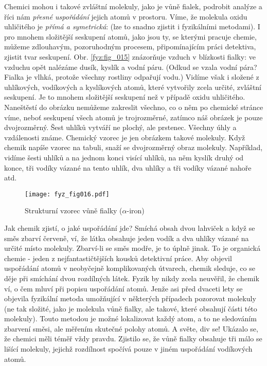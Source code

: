{      Chemici mohou i takové zvláštní molekuly, jako je vůně fialek, podrobit analýze a říci nám 
      \emph{přesné uspořádání} jejich atomů v prostoru. Víme, že molekula oxidu uhličitého je 
      \emph{přímá a symetrická}:  (lze to snadno zjistit i fyzikálními 
      metodami). I pro mnohem složitější seskupení atomů, jako jsou ty, se kterými pracuje chemie, 
      můžeme zdlouhavým, pozoruhodným procesem, připomínajícím práci detektiva, zjistit tvar 
      seskupení. Obr. \ref{fyz:fig_015} znázorňuje vzduch v blízkosti fialky: ve vzduchu opět 
      nalézáme dusík, kyslík a vodní páru. (Odkud se vzala vodní pára? Fialka je vlhká, protože 
      všechny rostliny odpařují vodu.) Vidíme však i  složené z uhlíkových, vodíkových 
      a kyslíkových atomů, které vytvořily zcela určité, zvláštní seskupení. Je to mnohem 
      složitější seskupení než v případě oxidu uhličitého. Naneštěstí do obrázku nemůžeme zakreslit 
      všechno, co o něm po chemické stránce víme, neboť seskupení všech atomů je trojrozměrné, 
      zatímco náš obrázek je pouze dvojrozměrný. Šest uhlíků vytváří ne plochý, ale  
      prstenec. Všechny úhly a vzdálenosti známe. Chemický vzorec je jen obrázkem takové molekuly. 
      Když chemik napíše vzorec na tabuli, snaží se  dvojrozměrný obraz molekuly. 
      Například, vidíme  šesti uhlíků a na jednom konci visící  uhlíků, na 
      něm kyslík druhý od konce, tři vodíky vázané na tento uhlík, dva uhlíky a tři vodíky vázané 
      nahoře atd.

      \begin{wrapfigure}[11]{r}{5cm}   %
        \centering
        \texttt{[image: fyz\_fig016.pdf]}
        \caption{Strukturní vzorec vůně fialky (\(\alpha\)-iron) \cite[s.~24]{Feynman01}}
        \label{fyz:fig_016}
      \end{wrapfigure}
      Jak chemik zjistí, o jaké uspořádání jde? Smíchá obsah dvou lahviček a když se směs zbarví 
      červeně, ví, že látka obsahuje jeden vodík a dva uhlíky vázané na určité místo molekuly. 
      Zbarví-li se směs modře, je to úplně jinak. To je organická chemie - jeden z 
      nejfantastičtějších kousků detektivní práce. Aby objevil uspořádání atomů v neobyčejně 
      komplikovaných útvarech, chemik sleduje, co se děje při smíchání dvou rozdílných látek. Fyzik 
      by nikdy zcela neuvěřil, že chemik ví, o čem mluví při popisu uspořádání atomů. Jenže asi 
      před dvaceti lety se objevila fyzikální metoda umožňující v některých případech pozorovat 
      molekuly (ne tak složité, jako je molekula vůně fialky, ale takové, které obsahují části této 
      molekuly). Touto metodou je možné lokalizovat každý atom, a to ne sledováním zbarvení směsi, 
      ale měřením skutečné polohy atomů. A světe, div se! Ukázalo se, že chemici měli téměř vždy 
      pravdu. Zjistilo se, že vůně fialky obsahuje tři málo se lišící molekuly, jejichž rozdílnost 
      spočívá pouze v jiném uspořádání vodíkových atomů. 
      
}
